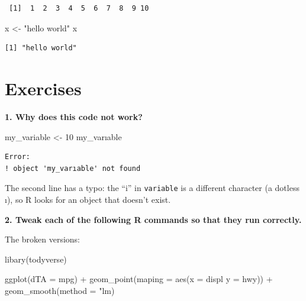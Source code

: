 \documentclass[
  letterpaper,
  DIV=11,
  numbers=noendperiod]{scrreprt}
\newenvironment{Shaded}{\begin{snugshade}}{\end{snugshade}}
\newcommand{\AttributeTok}[1]{\textcolor[rgb]{0.40,0.45,0.13}{#1}}
\newcommand{\DecValTok}[1]{\textcolor[rgb]{0.68,0.00,0.00}{#1}}
\newcommand{\FunctionTok}[1]{\textcolor[rgb]{0.28,0.35,0.67}{#1}}
\newcommand{\NormalTok}[1]{\textcolor[rgb]{0.00,0.23,0.31}{#1}}
\newcommand{\OtherTok}[1]{\textcolor[rgb]{0.00,0.23,0.31}{#1}}
\newcommand{\SpecialCharTok}[1]{\textcolor[rgb]{0.37,0.37,0.37}{#1}}
\newcommand{\StringTok}[1]{\textcolor[rgb]{0.13,0.47,0.30}{#1}}
\begin{document}
\begin{verbatim}
 [1]  1  2  3  4  5  6  7  8  9 10
\end{verbatim}

\begin{Shaded}
\begin{Highlighting}[]
\NormalTok{x }\OtherTok{\textless{}{-}} \StringTok{"hello world"}
\NormalTok{x}
\end{Highlighting}
\end{Shaded}

\begin{verbatim}
[1] "hello world"
\end{verbatim}

\section{Exercises}\label{exercises-3}

\textbf{1. Why does this code not work?}

\begin{Shaded}
\begin{Highlighting}[]
\NormalTok{my\_variable }\OtherTok{\textless{}{-}} \DecValTok{10}
\NormalTok{my\_varıable}
\end{Highlighting}
\end{Shaded}

\begin{verbatim}
Error:
! object 'my_varıable' not found
\end{verbatim}

The second line has a typo: the ``i'' in \texttt{variable} is a
different character (a dotless ı), so R looks for an object that doesn't
exist.

\textbf{2. Tweak each of the following R commands so that they run
correctly.}

The broken versions:

\begin{Shaded}
\begin{Highlighting}[]
\FunctionTok{libary}\NormalTok{(todyverse)}

\FunctionTok{ggplot}\NormalTok{(}\AttributeTok{dTA =}\NormalTok{ mpg) }\SpecialCharTok{+}
  \FunctionTok{geom\_point}\NormalTok{(}\AttributeTok{maping =} \FunctionTok{aes}\NormalTok{(}\AttributeTok{x =}\NormalTok{ displ }\AttributeTok{y =}\NormalTok{ hwy)) }\SpecialCharTok{+}
  \FunctionTok{geom\_smooth}\NormalTok{(}\AttributeTok{method =} \StringTok{"lm)}
\end{Highlighting}
\end{Shaded}
\end{document}
